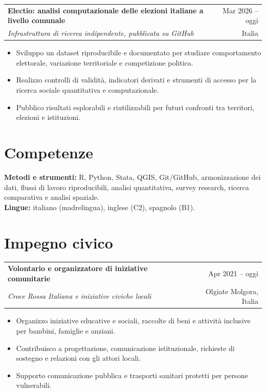 \documentclass[11pt,a4paper]{article}
\makeatletter
\newcommand{\cventry}[4]{%
  \begin{tabularx}{\textwidth}{@{}Xr@{}}
    {\textbf{#1}} & {#4}\\
    {\emph{#2}} & {#3}
  \end{tabularx}\vspace{0.2em}
}
\makeatother
\begin{document}
\cventry{Electio: analisi computazionale delle elezioni italiane a livello comunale}{Infrastruttura di ricerca indipendente, pubblicata su GitHub}{Italia}{Mar 2026 -- oggi}
\begin{itemize}
  \item Sviluppo un dataset riproducibile e documentato per studiare comportamento elettorale, variazione territoriale e competizione politica.
  \item Realizzo controlli di validità, indicatori derivati e strumenti di accesso per la ricerca sociale quantitativa e computazionale.
  \item Pubblico risultati esplorabili e riutilizzabili per futuri confronti tra territori, elezioni e istituzioni.
\end{itemize}

\section*{Competenze}

\textbf{Metodi e strumenti:} R, Python, Stata, QGIS, Git/GitHub, armonizzazione dei dati, flussi di lavoro riproducibili, analisi quantitativa, survey research, ricerca comparativa e analisi spaziale.\\
\textbf{Lingue:} italiano (madrelingua), inglese (C2), spagnolo (B1).

\section*{Impegno civico}

\cventry{Volontario e organizzatore di iniziative comunitarie}{Croce Rossa Italiana e iniziative civiche locali}{Olgiate Molgora, Italia}{Apr 2021 -- oggi}
\begin{itemize}
  \item Organizzo iniziative educative e sociali, raccolte di beni e attività inclusive per bambini, famiglie e anziani.
  \item Contribuisco a progettazione, comunicazione istituzionale, richieste di sostegno e relazioni con gli attori locali.
  \item Supporto comunicazione pubblica e trasporti sanitari protetti per persone vulnerabili.
\end{itemize}
\end{document}
